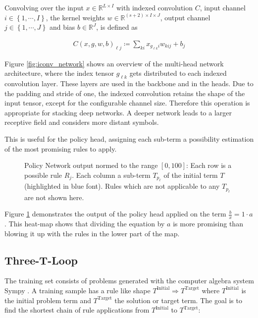 \documentclass{scrartcl}
\theoremstyle{definition}
\begin{document}
Convolving over the input $x \in \mathbb{R}^{L\times I}$ with indexed convolution $C$, input channel $i \in \left\{1,\cdots,I \right\}$,
the kernel weights $w \in \mathbb{R}^{\left( s+2 \right)\times I \times J}$, output channel $j \in \left\{1,\cdots,J\right\}$ and bias $b \in \mathbb{R}^J$,
is defined as

\begin{align}
	C\left( x, g, w, b \right)_{\ell j} \coloneqq \sum_{ki}x_{g_{\ell k}i} w_{kij}+b_j
\end{align}

Figure \ref{fig:iconv_network} shows an overview of the multi-head network architecture, where the index tensor $g_{\ell k}$ gets distributed to each indexed convolution layer.
These layers are used in the backbone and in the heads.
Due to the padding and stride of one, the indexed convolution retains the shape of the input tensor, except for the configurable channel size.
Therefore this operation is appropriate for stacking deep networks.
A deeper network leads to a larger receptive field and considers more distant symbols.

This is useful for the policy head, assigning each sub-term a possibility estimation of the most promising rules to apply.

\begin{figure}[!htbp]
	\centering
	
	\caption{Policy Network output normed to the range $[0,100]$: Each row is a possible rule $R_j$. Each column a sub-term $T_{p_\ell}$ of the initial term $T$ (highlighted in blue font).
	Rules which are not applicable to any $T_{p_\ell}$ are not shown here.
	}
	\label{fig:network_output}
\end{figure}

Figure \ref{fig:network_output} demonstrates the output of the policy head applied on the term $\frac{b}{x}=1\cdot a$.
This heat-map shows that dividing the equation by $a$ is more promising than blowing it up with the rules in the lower part of the map.


\subsection{Three-T-Loop}

The training set consists of problems generated with the computer algebra system Sympy \cite{10.7717/peerj-cs.103}.
A training sample has a rule like shape $T^\text{Initial} \Longrightarrow T^\text{Target}$ where $T^\text{Initial}$ is the initial problem term and $T^\text{Target}$ the solution or target term.
The goal is to find the shortest chain of rule applications from $T^\text{Initial}$ to $T^\text{Target}$:
\end{document}
